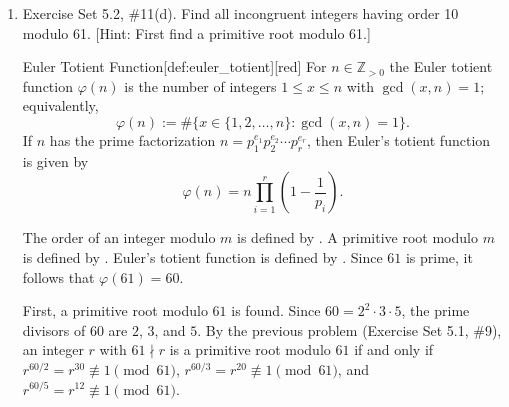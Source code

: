 \begin{enumerate}
\begin{subprove}
    ($\Leftarrow$) Suppose $r^{(p-1)/q} \not\equiv 1 \pmod{p}$ for all prime divisors $q$ of $p-1$ for the sake of direct proof.
    It is shown that $r$ is a primitive root modulo $p$, i.e., $\operatorname{ord}_p(r) = p-1$.
    Let $d = \operatorname{ord}_p(r)$. By , $d$ divides $p-1$.
    Suppose, for the sake of contradiction, that $d < p-1$.
    Then $p-1 = d \cdot k$ for some integer $k > 1$.
    Since $k > 1$, there exists a prime divisor $q$ of $k$, and hence $q$ is also a prime divisor of $p-1$.
    Since $q \mid k$ and $p-1 = d \cdot k$, it follows that $d \mid (p-1)/q$.
    Therefore, $(p-1)/q = d \cdot \ell$ for some positive integer $\ell$.
    Since $r^d \equiv 1 \pmod{p}$ by , it follows that
    \[
    r^{(p-1)/q} = r^{d \cdot \ell} = (r^d)^\ell \equiv 1^\ell \equiv 1 \pmod{p},
    \]
    which contradicts the assumption that $r^{(p-1)/q} \not\equiv 1 \pmod{p}$ for all prime divisors $q$ of $p-1$.
    Therefore, $d = p-1$, so $\operatorname{ord}_p(r) = p-1 = \varphi(p)$.
    Hence, by , $r$ is a primitive root modulo $p$.
    
    Therefore, by ($\Rightarrow$) and ($\Leftarrow$), $r$ is a primitive root modulo $p$ if and only if $r^{(p-1)/q} \not\equiv 1 \pmod{p}$ for all prime divisors $q$ of $p-1$.
  \end{subprove}

  \item Exercise Set 5.2, \#11(d). Find all incongruent integers having order 10 modulo 61. 
  [Hint: First find a primitive root modulo 61.]
  \begin{define}{Euler Totient Function}[def:euler_totient][red]
    For $n\in\mathbb{Z}_{>0}$ the Euler totient function $\varphi(n)$ is the number of integers
    $1\le x\le n$ with $\gcd(x,n)=1$; equivalently,
    \[
    \varphi(n):=\#\{x\in\{1,2,\dots,n\}:\gcd(x,n)=1\}.
    \]
    If $n$ has the prime factorization $n = p_1^{e_1} p_2^{e_2} \cdots p_r^{e_r}$, then Euler's totient function is given by
    \[
    \varphi(n) = n \prod_{i=1}^{r} \left(1 - \frac{1}{p_i}\right).
    \]
  \end{define}  
  \begin{subanswer}
    The order of an integer modulo $m$ is defined by .
    A primitive root modulo $m$ is defined by .
    Euler's totient function is defined by .
    Since $61$ is prime, it follows that $\varphi(61) = 60$.
    
    First, a primitive root modulo $61$ is found. Since $60 = 2^2 \cdot 3 \cdot 5$, the prime divisors of $60$ are $2$, $3$, and $5$.
    By the previous problem (Exercise Set 5.1, \#9), an integer $r$ with $61 \nmid r$ is a primitive root modulo $61$ if and only if $r^{60/2} = r^{30} \not\equiv 1 \pmod{61}$, $r^{60/3} = r^{20} \not\equiv 1 \pmod{61}$, and $r^{60/5} = r^{12} \not\equiv 1 \pmod{61}$.
    

\end{subanswer}
\end{enumerate}
